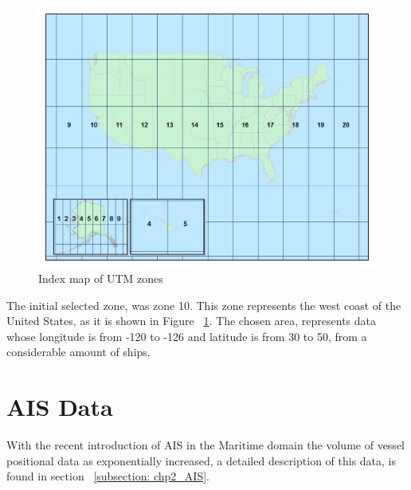 \begin{figure}[H]
	\centering
	\includegraphics[scale = .35]{figures/UTMZoneMap2014.png}
    \caption{Index map of UTM zones}
    \label{fig: UMT zones}
\end{figure}

The initial selected zone, was zone 10. This zone represents the west coast of the United States, as it is shown in Figure ~\ref{fig: UMT zones}.
The chosen area, represents data whose longitude is from -120 to -126 and latitude is from 30 to 50, from a considerable amount of ships.


\section{AIS Data}
\label{section: AIS Data}
 With the recent introduction of AIS in the Maritime domain the volume of vessel positional data as exponentially increased, a detailed description of this data, is found in section ~\ref{subsection: chp2_AIS}.

